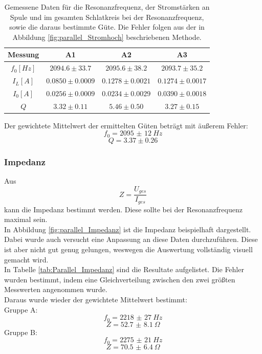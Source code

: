 \documentclass[12pt,a4paper]{article}
\begin{document}
\begin{table}
\centering
\begin{tabular}{|c|c|c|c|}
\hline
Messung & A1 & A2 & A3\\
\hline
$f_0[Hz]$ & $2094.6\pm 33.7$ & $2095.6\pm 38.2$ & $2093.7\pm 35.2$\\
\hline
$I_L[A]$ & $0.0850\pm 0.0009$ & $0.1278\pm 0.0021$ & $0.1274\pm 0.0017$ \\
\hline
$I_0[A]$ & $0.0256\pm 0.0009$ & $0.0234\pm 0.0029$ & $0.0390\pm 0.0018$ \\
\hline
$Q$ & $3.32\pm 0.11$ & $5.46\pm 0.50$ & $3.27\pm 0.15$ \\
\hline
\end{tabular}
\caption{Gemessene Daten für die Resonanzfrequenz, der Stromstärken an Spule und im gesamten Schlatkreis bei der Resonanzfrequenz, sowie die daraus bestimmte Güte. Die Fehler folgen aus der in Abbildung \ref{fig:parallel_Stromhoch} beschriebenen Methode.}
\label{tab:Stromhoch_Rohdaten}
\end{table}
Der gewichtete Mittelwert der ermittelten Güten beträgt mit äußerem Fehler:
\begin{equation}
f_0 = \SI{2095(12)}{Hz}
\end{equation}
\begin{equation}
Q = 3.37\pm 0.26 
\end{equation}

\subsubsection{Impedanz}
Aus
\begin{equation}
Z = \dfrac{U_{ges}}{I_{ges}}
\end{equation}
kann die Impedanz bestimmt werden. Diese sollte bei der Resonanzfrequenz maximal sein.\\
In Abbildung \ref{fig:parallel_Impedanz} ist die Impedanz beispielhaft dargestellt. Dabei wurde auch versucht eine Anpassung an diese Daten durchzuführen. Diese ist aber nicht gut genug gelungen, weswegen die Auswertung vollständig visuell gemacht wird.\\
In Tabelle \ref{tab:Parallel_Impedanz} sind die Resultate aufgelistet. Die Fehler wurden bestimmt, indem eine Gleichverteilung zwischen den zwei größten Messwerten angenommen wurde.\\
Daraus wurde wieder der gewichtete Mittelwert bestimmt:\\
Gruppe A:
\begin{equation}
f_0 = \SI{2218(27)}{Hz}
\end{equation}
\begin{equation}
Z = \SI{52.7(81)}{\Omega}
\end{equation}
Gruppe B:
\begin{equation}
f_0 = \SI{2275(21)}{Hz}
\end{equation}
\begin{equation}
Z = \SI{70.5(64)}{\Omega}
\end{equation}
\end{document}
